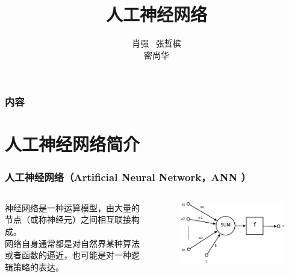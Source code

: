 \documentclass{beamer}
\title{人工神经网络}
\author{肖强 \ 张哲槟\\密尚华}
\institute{}
\begin{document}
  
  
\begin{frame}
\titlepage
\end{frame}

\begin{frame}
	\frametitle{内容}
	
	\begin{multicols}{2}
		\tableofcontents
	\end{multicols}
\end{frame}

\section{人工神经网络简介}

\begin{frame} 
\frametitle{人工神经网络（Artificial Neural Network，ANN ）}  
\begin{columns}

神经网络是一种运算模型，由大量的节点（或称神经元）之间相互联接构成。
\\ 网络自身通常都是对自然界某种算法或者函数的逼近，也可能是对一种逻辑策略的表达。

	\begin{figure}[ht]
	\centering
	\includegraphics[width=\linewidth]{partition/img/Ncell.png}  
	\end{figure}


\end{columns}


\end{frame}  


\end{document}
